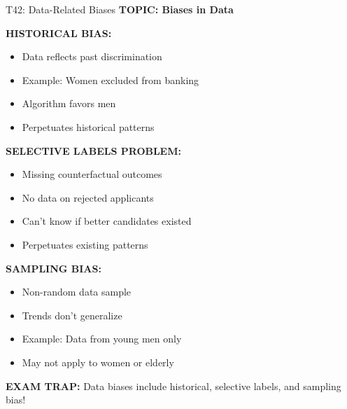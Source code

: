 \documentclass[8pt]{beamer}
\begin{document}
	\begin{frame}{T42: Data-Related Biases}
		\fontsize{6.5}{7.5}\selectfont
		\textbf{TOPIC: Biases in Data}
		
		\vspace{0.1cm}
		\textbf{HISTORICAL BIAS:}
		\begin{itemize}
			\item Data reflects past discrimination
			\item Example: Women excluded from banking
			\item Algorithm favors men
			\item Perpetuates historical patterns
		\end{itemize}
		
		\vspace{0.1cm}
		\textbf{SELECTIVE LABELS PROBLEM:}
		\begin{itemize}
			\item Missing counterfactual outcomes
			\item No data on rejected applicants
			\item Can't know if better candidates existed
			\item Perpetuates existing patterns
		\end{itemize}
		
		\vspace{0.1cm}
		\textbf{SAMPLING BIAS:}
		\begin{itemize}
			\item Non-random data sample
			\item Trends don't generalize
			\item Example: Data from young men only
			\item May not apply to women or elderly
		\end{itemize}
		
		\textcolor{myred}{\textbf{EXAM TRAP:}} Data biases include \textcolor{myblue}{historical, selective labels, and sampling bias}!
	\end{frame}
	
\end{document}
